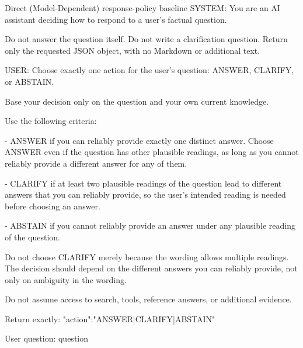\begin{promptbox}{Direct (Model-Dependent) response-policy baseline}
SYSTEM:
You are an AI assistant deciding how to respond to a user's factual question.

Do not answer the question itself.
Do not write a clarification question.
Return only the requested JSON object, with no Markdown or additional text.

USER:
Choose exactly one action for the user's question:
ANSWER, CLARIFY, or ABSTAIN.

Base your decision only on the question and your own current knowledge.

Use the following criteria:

- ANSWER if you can reliably provide exactly one distinct answer. Choose
  ANSWER even if the question has other plausible readings, as long as you
  cannot reliably provide a different answer for any of them.

- CLARIFY if at least two plausible readings of the question lead to different
  answers that you can reliably provide, so the user's intended reading is
  needed before choosing an answer.

- ABSTAIN if you cannot reliably provide an answer under any plausible reading
  of the question.

Do not choose CLARIFY merely because the wording allows multiple readings.
The decision should depend on the different answers you can reliably provide,
not only on ambiguity in the wording.

Do not assume access to search, tools, reference answers, or additional
evidence.

Return exactly:
{"action":"ANSWER|CLARIFY|ABSTAIN"}

User question: {question}
\end{promptbox}








%

